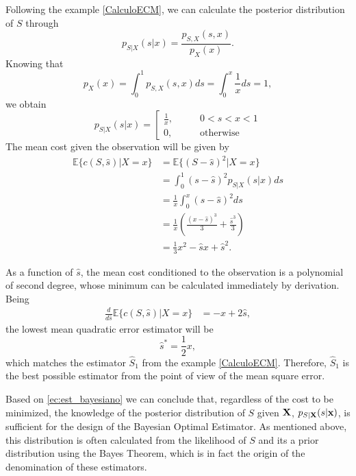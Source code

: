 \begin{example}
\label{CalculoECM2}
Following the example \ref{CalculoECM}, we can calculate the posterior distribution of $S$ through
\begin{equation}
p_{S|X}(s|x) = \frac{p_{S,X}(s,x)}{p_{X}(x)}. 
\end{equation}
Knowing that
\begin{equation}
p_{X}(x) = \int_0^1 p_{S,X}(s,x) ds = \int_0^x \frac{1}{x} ds = 1,
\end{equation}
we obtain
\begin{equation}
p_{S|X}(s|x) = \left[
\begin{array}{ll}
\frac{1}{x}, & \qquad 0<s<x<1 \\
0,           & \qquad \text{otherwise}
\end{array}
\right.
\end{equation}
The mean cost given the observation will be given by
\begin{align}
\mathbb{E}\{c(S,\hat s)|X=x\} 
   &= \mathbb{E}\{(S-\hat s)^2|X=x\} \nonumber\\
   &= \int_0^1 (s-\hat{s})^2 p_{S|X}(s|x) ds   \nonumber\\
   &= \frac{1}{x} \int_0^x (s-\hat{s})^2 ds   \nonumber\\
   &= \frac{1}{x} \left(\frac{(x-\hat{s})^3}{3} + \frac{\hat{s}^3}{3} \right)    \nonumber\\
   &= \frac{1}{3}x^2 - \hat{s} x + \hat{s}^2. 
\label{Est:ECMsx}
\end{align}

As a function of $\hat{s}$, the mean cost conditioned to the observation is a polynomial of second degree, whose minimum can be calculated immediately by derivation. Being
\begin{align}
\frac{d}{d\hat{s}} \mathbb{E}\{c(S,\hat s)|X=x\} 
   &= - x + 2 \hat{s} ,
\end{align}
the lowest mean quadratic error estimator will be
\begin{equation}
\label{eq:sopt_halfx}
\hat{s}^* = \frac{1}{2}x,
\end{equation}
which matches the estimator $\hat{S}_1$ from the example \ref{CalculoECM}. Therefore, $\hat{S}_1$ is the best possible estimator from the point of view of the mean square error.
\end{example}\vspace{0.4cm}

Based on \eqref{ec:est_bayesiano} we can conclude that, regardless of the cost to be minimized, the knowledge of the posterior distribution of $S$ given ${\bf X}$, $p_{S|{\bf X}}(s|{\bf x})$, is sufficient for the design of the Bayesian Optimal Estimator. As mentioned above, this distribution is often calculated from the likelihood of $S$ and its a prior distribution using the Bayes Theorem, which is in fact the origin of the denomination of these estimators.

